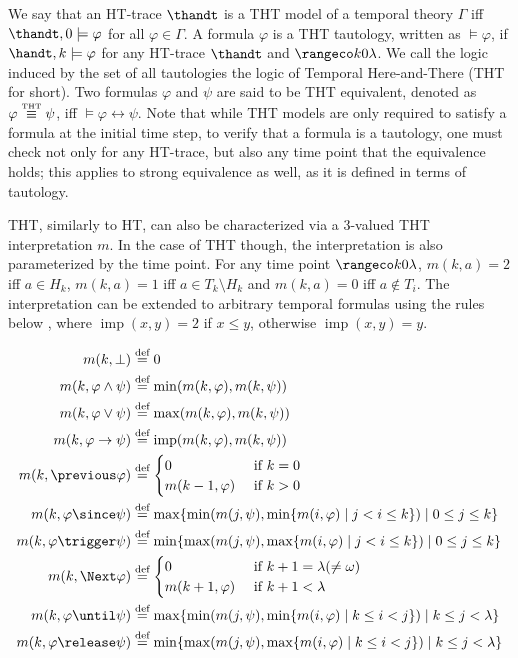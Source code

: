We say that an HT-trace $\thandt$ is a THT model of a temporal theory
$\Gamma$ iff $\thandt,0 \models \varphi$ for all $\varphi \in
\Gamma$. A formula $\varphi$ is a THT tautology, written as
$\models \varphi$, if $\handt,k \models \varphi$ for any HT-trace
$\thandt$ and $\kinlambda$. We call the logic induced by
the set of all tautologies the logic of Temporal Here-and-There (THT
for short). Two formulas $\varphi$ and $\psi$ are said to be THT
equivalent, denoted as $\varphi \stackrel{\normalfont\mbox{\tiny THT}}{\equiv} \psi$, iff
$\models \varphi \leftrightarrow \psi$. Note that while THT models are
only required to satisfy a formula at the initial time step, to verify
that a formula is a tautology, one must check not only for any
HT-trace, but also any time point that the equivalence holds; this
applies to strong equivalence as well, as it is defined in terms of
tautology.

THT, similarly to HT, can also be characterized via a 3-valued THT
interpretation $m$. In the case of THT though, the interpretation is
also parameterized by the time point. For any time point $\kinlambda$,
$m(k,a)=2$ iff $a \in H_k$, $m(k,a)=1$ iff $a \in T_k \setminus H_k$
and $m(k,a)=0$ iff $a \not\in T_i$. The interpretation can be extended
to arbitrary temporal formulas using the rules below
\cite{agcadipescscvi20a}, where $\operatorname{imp}(x,y)=2$ if
$x \leq y$, otherwise $\operatorname{imp}(x,y)=y$.

\begin{align*}
  m(k, \perp) &\defeq 0 \\
  m(k, \varphi \wedge \psi) &\defeq \min (m(k, \varphi), m(k, \psi)) \\
  m(k, \varphi \vee \psi) &\defeq \max (m(k, \varphi), m(k, \psi)) \\
  m(k, \varphi \rightarrow \psi) &\defeq \operatorname{imp}(m(k, \varphi), m(k, \psi)) \\
  m(k, \previous \varphi) &\defeq \begin{cases}
    0 & \text { if } k=0 \\
    m(k-1, \varphi) & \text { if } k>0
  \end{cases} \\
 m(k, \varphi \since \psi) &\defeq \max \{\min (m(j, \psi), \min \{m(i, \varphi) \mid j<i \leq k\}) \mid 0 \leq j \leq k\} \\
 m(k, \varphi \trigger \psi) &\defeq \min \{\max (m(j, \psi), \max \{m(i, \varphi) \mid j<i \leq k\}) \mid 0 \leq j \leq k\} \\
 m(k, \Next \varphi) &\defeq \begin{cases}0 & \text { if } k+1=\lambda(\neq \omega) \\
m(k+1, \varphi) & \text { if } k+1<\lambda\end{cases} \\
 m(k, \varphi \until \psi) &\defeq \max \{\min (m(j, \psi), \min \{m(i, \varphi) \mid k \leq i<j\}) \mid k \leq j<\lambda\} \\
 m(k, \varphi \release \psi) &\defeq \min \{\max (m(j, \psi), \max \{m(i, \varphi) \mid k \leq i<j\}) \mid k \leq j<\lambda\}
\end{align*}

